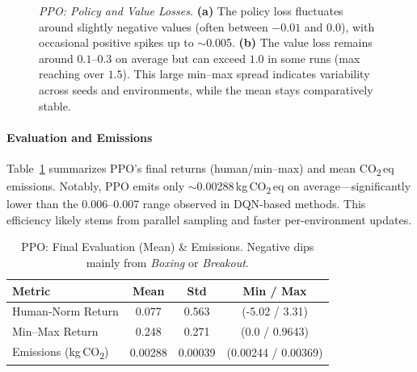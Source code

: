 \begin{figure} 
	\centering
	\quad
	\caption{\emph{PPO: Policy and Value Losses.}
		\textbf{(a)} The policy loss fluctuates around slightly negative values 
		(often between $-0.01$ and $0.0$), with occasional positive spikes up to $\sim$\num{0.005}. 
		\textbf{(b)} The value loss remains around $0.1$--$0.3$ on average but can exceed $1.0$ in some runs 
		(max reaching over $1.5$). This large min--max spread indicates variability across seeds and environments, 
		while the mean stays comparatively stable.}
	\label{fig:ppo_pol_val_losses}
\end{figure}

\paragraph{Evaluation and Emissions}
Table~\ref{tab:ppo_eval} summarizes PPO's final returns (human/min--max) and mean CO\textsubscript{2}\,eq emissions. 
Notably, PPO emits only $\sim$\num{0.00288}\,kg\,CO\textsubscript{2}\,eq on average—significantly lower than the 0.006--0.007 range observed in DQN-based methods. This efficiency likely stems from parallel sampling and faster per-environment updates.

\begin{table} 
	\caption{PPO: Final Evaluation (Mean) \& Emissions. Negative dips mainly from \emph{Boxing} or \emph{Breakout}.}
	\label{tab:ppo_eval}
	\centering
	\begin{tabular}{lccc}
		\toprule
		\textbf{Metric} & \textbf{Mean} & \textbf{Std} & \textbf{Min / Max}\\
		\midrule
		Human‐Norm Return & 0.077 & 0.563 & (-5.02 / 3.31)\\
		Min--Max Return   & 0.248 & 0.271 & (0.0 / 0.9643)\\
		Emissions (kg\,CO\textsubscript{2}) & 0.00288 & 0.00039 & (0.00244 / 0.00369)\\
		\bottomrule
	\end{tabular}
\end{table}
\medskip
